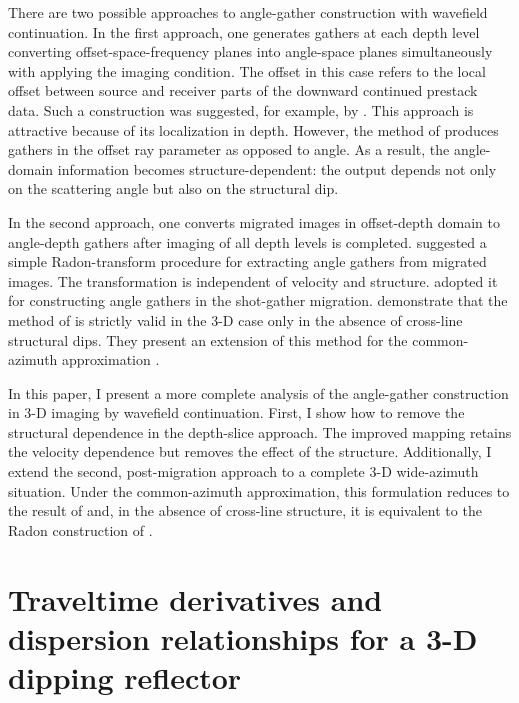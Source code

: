 There are two possible approaches to angle-gather construction with wavefield
continuation. In the first approach, one generates gathers at each depth level
converting offset-space-frequency planes into angle-space planes
simultaneously with applying the imaging condition. The offset in this case
refers to the local offset between source and receiver parts of the downward
continued prestack data. Such a construction was suggested, for example, by
\cite{SEG-1999-08240827}. This approach is attractive because of its
localization in depth. However, the method of \cite{SEG-1999-08240827}
produces gathers in the offset ray parameter as opposed to angle. As a result,
the angle-domain information becomes structure-dependent: the output depends
not only on the scattering angle but also on the structural dip.

In the second approach, one converts migrated images in offset-depth domain to
angle-depth gathers after imaging of all depth levels is completed.
\cite{GEO68-03-10651074} suggested a simple Radon-transform procedure for
extracting angle gathers from migrated images. The transformation is
independent of velocity and structure. \cite{GEO67-03-08830889} adopted it
for constructing angle gathers in the shot-gather migration.  \cite{new}
demonstrate that the method of \cite{GEO68-03-10651074} is strictly valid
in the 3-D case only in the absence of cross-line structural dips. They
present an extension of this method for the common-azimuth approximation
\cite[]{GEO61-06-18221832}.

In this paper, I present a more complete analysis of the angle-gather
construction in 3-D imaging by wavefield continuation. First, I show how to
remove the structural dependence in the depth-slice approach. The improved
mapping retains the velocity dependence but removes 
the effect of the structure. Additionally, I extend the second, post-migration
approach to a complete 3-D wide-azimuth situation.  Under the common-azimuth
approximation, this formulation reduces to the result of \cite{newseg}
and, in the absence of cross-line structure, it is equivalent to the Radon
construction of \cite{GEO68-03-10651074}. 

\section{Traveltime derivatives and dispersion relationships for a
  3-D dipping reflector}

